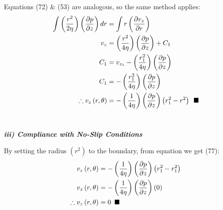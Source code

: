 \documentclass[titlepage]{article}
\begin{document}
\noindent Equations (72) \& (53) are analogous, so the same method applies:
\begingroup
    \addtolength\jot{6pt}
    \begin{align}
        \int{\left(\displaystyle\frac{r^2}{2\eta}\right)\left(\frac{\partial{p}}{\partial{z}}\right)dr}&=\int{r\left(\displaystyle\frac{\partial{v_{z}}}{\partial{r}}\right)}\\
        v_{z} &= \left(\displaystyle\frac{r^2}{4\eta}\right)\left(\displaystyle\frac{\partial{p}}{\partial{z}}\right)+C_{1}\\
        C_{1} &= v_{z_{1}} - \left(\displaystyle\frac{r_{1}^2}{4\eta}\right)\left(\displaystyle\frac{\partial{p}}{\partial{z}}\right) \\
        C_{1} &= - \left(\displaystyle\frac{r_{1}^2}{4\eta}\right)\left(\displaystyle\frac{\partial{p}}{\partial{z}}\right) \\
        \therefore v_{z}\left(r,\theta\right) &= -\left(\displaystyle\frac{1}{4\eta}\right)\left(\displaystyle\frac{\partial{p}}{\partial{z}}\right)\left(r_{1}^2-r^2\right)\hspace*{5pt}\blacksquare
    \end{align}
\endgroup \\

\begin{center}
    \textbf{\emph{iii) Compliance with No-Slip Conditions}}
\end{center}

\noindent By setting the radius $\left(r^2\right)$ to the boundary, from equation we get (77):
\begin{align}
    v_{z}\left(r,\theta\right) &= -\left(\displaystyle\frac{1}{4\eta}\right)\left(\displaystyle\frac{\partial{p}}{\partial{z}}\right)\left(r_{1}^2-r_{1}^2\right)\\
    v_{z}\left(r,\theta\right) &= -\left(\displaystyle\frac{1}{4\eta}\right)\left(\displaystyle\frac{\partial{p}}{\partial{z}}\right)\left(0\right)\\
    \therefore v_{z}\left(r,\theta\right) &= 0 \hspace*{5pt}\blacksquare
\end{align} 
\end{document}
